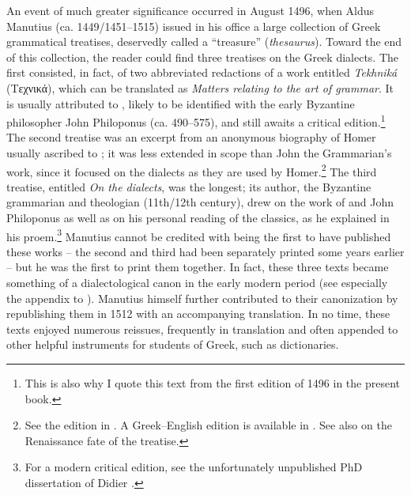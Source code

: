 An event of much greater significance occurred in August 1496, when Aldus Manutius (ca. 1449/1451–1515) issued in his  office a large collection of Greek grammatical treatises, deservedly called a “treasure” (\textit{thesaurus}). Toward the end of this collection, the reader could find three treatises on the Greek dialects. The first consisted, in fact, of two abbreviated redactions of a work entitled \textit{Tekhniká} (Tεχνικά), which can be translated as \textit{Matters relating to the art of grammar}. It is usually attributed to , likely to be identified with the early Byzantine philosopher John Philoponus (ca. 490–575), and still awaits a critical edition.\footnote{This is also why I quote this text from the first edition of 1496 in the present book.} The second treatise was an excerpt from an anonymous biography of Homer usually ascribed to ; it was less extended in scope than John the Grammarian’s work, since it focused on the dialects as they are used by Homer.\footnote{See the edition in \citet{Kindstrand1990}. A Greek–English edition is available in \citet{Keaney1996}. See also \citet{VanRooy2018c} on the Renaissance fate of the treatise.} The third treatise, entitled \textit{On the dialects}, was the longest; its author, the Byzantine grammarian and theologian  (11th/12th century), drew on the work of  and John Philoponus as well as on his personal reading of the classics, as he explained in his proem.\footnote{For a modern critical edition, see the unfortunately unpublished PhD dissertation of Didier \citet{Xhardez1991}.} Manutius cannot be credited with being the first to have published these works – the second and third had been separately printed some years earlier – but he was the first to print them together. In fact, these three texts became something of a dialectological canon in the early modern period (see especially the appendix to \citealt{Trovato1984}). Manutius himself further contributed to their canonization by republishing them in 1512 with an accompanying  translation. In no time, these texts enjoyed numerous reissues, frequently in  translation and often appended to other helpful instruments for students of Greek, such as dictionaries.

